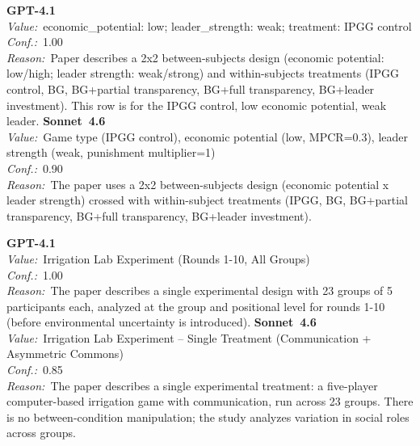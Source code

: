 \documentclass[11pt,a4paper]{article}
\begin{document}
\begin{tcolorbox}[
  title={\textbf{indep\_var} \textbar{} DOI: 10.1038\_s41562-017-0138 \textbar{} Cond.~0},
  colback=blue!3!white,
  colframe=blue!45!black,
  fonttitle=\small\sffamily,
  sidebyside,
  sidebyside align=top seam,
  lower separated=false,
  breakable,
  before upper={\small},
  before lower={\small},
]
\textbf{GPT-4.1}\\[2pt]
\textit{Value:}~economic\_potential: low; leader\_strength: weak; treatment: IPGG control\\[3pt]
\textit{Conf.:}~1.00\\[3pt]
\textit{Reason:}~Paper describes a 2x2 between-subjects design (economic potential: low/high; leader strength: weak/strong) and within-subjects treatments (IPGG control, BG, BG+partial transparency, BG+full transparency, BG+leader investment). This row is for the IPGG control, low economic potential, weak leader.
\tcblower
\textbf{Sonnet~4.6}\\[2pt]
\textit{Value:}~Game type (IPGG control), economic potential (low, MPCR=0.3), leader strength (weak, punishment multiplier=1)\\[3pt]
\textit{Conf.:}~0.90\\[3pt]
\textit{Reason:}~The paper uses a 2x2 between-subjects design (economic potential x leader strength) crossed with within-subject treatments (IPGG, BG, BG+partial transparency, BG+full transparency, BG+leader investment).
\end{tcolorbox}

\begin{tcolorbox}[
  title={\textbf{data\_id} \textbar{} DOI: 10.5751\_es-07493-200323 \textbar{} Cond.~0},
  colback=blue!3!white,
  colframe=blue!45!black,
  fonttitle=\small\sffamily,
  sidebyside,
  sidebyside align=top seam,
  lower separated=false,
  breakable,
  before upper={\small},
  before lower={\small},
]
\textbf{GPT-4.1}\\[2pt]
\textit{Value:}~Irrigation Lab Experiment (Rounds 1-10, All Groups)\\[3pt]
\textit{Conf.:}~1.00\\[3pt]
\textit{Reason:}~The paper describes a single experimental design with 23 groups of 5 participants each, analyzed at the group and positional level for rounds 1-10 (before environmental uncertainty is introduced).
\tcblower
\textbf{Sonnet~4.6}\\[2pt]
\textit{Value:}~Irrigation Lab Experiment -- Single Treatment (Communication + Asymmetric Commons)\\[3pt]
\textit{Conf.:}~0.85\\[3pt]
\textit{Reason:}~The paper describes a single experimental treatment: a five-player computer-based irrigation game with communication, run across 23 groups. There is no between-condition manipulation; the study analyzes variation in social roles across groups.
\end{tcolorbox}
\end{document}

